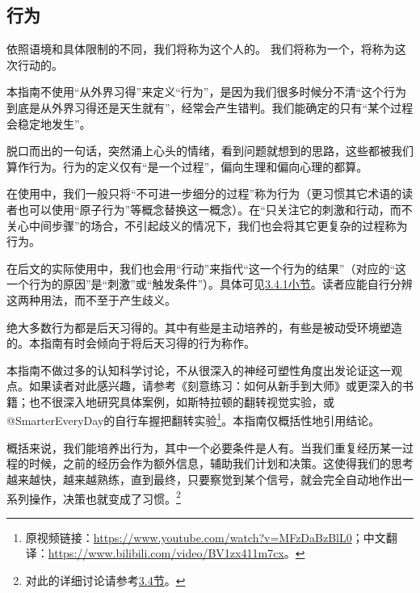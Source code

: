 \subsection{行为}
依照语境和具体限制的不同，我们将称为这个人的。%
我们将称为一个，将称为这次行动的。
\begin{explain}

本指南不使用“从外界习得”来定义“行为”，是因为我们很多时候分不清“这个行为到底是从外界习得还是天生就有”，经常会产生错判。我们能确定的只有“某个过程会稳定地发生”。

脱口而出的一句话，突然涌上心头的情绪，看到问题就想到的思路，这些都被我们算作行为。行为的定义仅有“是一个过程”，偏向生理和偏向心理的都算。

在使用中，我们一般只将“不可进一步细分的过程”称为行为（更习惯其它术语的读者也可以使用“原子行为”等概念替换这一概念）。在“只关注它的刺激和行动，而不关心中间步骤”的场合，不引起歧义的情况下，我们也会将其它更复杂的过程称为行为。

在后文的实际使用中，我们也会用“行动”来指代“这一个行为的结果”（对应的“这一个行为的原因”是“刺激”或“触发条件”）。具体可见\hyperref[para:行动]{3.4.1小节}。读者应能自行分辨这两种用法，而不至于产生歧义。
\end{explain}
绝大多数行为都是后天习得的。其中有些是主动培养的，有些是被动受环境塑造的。本指南有时会倾向于将后天习得的行为称作。
\begin{examples}
本指南不做过多的认知科学讨论，不从很深入的神经可塑性角度出发论证这一观点。如果读者对此感兴趣，请参考《刻意练习：如何从新手到大师》或更深入的书籍；也不很深入地研究具体案例，如斯特拉顿的翻转视觉实验，或@SmarterEveryDay的自行车握把翻转实验\footnote{原视频链接：\url{https://www.youtube.com/watch?v=MFzDaBzBlL0}；中文翻译：\url{https://www.bilibili.com/video/BV1zx411m7cx}。}。本指南仅概括性地引用结论。
\end{examples}
\label{para:记忆}概括来说，我们能培养出行为，其中一个必要条件是人有。当我们重复经历某一过程的时候，之前的经历会作为额外信息，辅助我们计划和决策。这使得我们的思考越来越快，越来越熟练，直到最终，只要察觉到某个信号，就会完全自动地作出一系列操作，决策也就变成了习惯。\footnote{对此的详细讨论请参考\hyperref[sec:人的意识演化基本模型]{3.4节}。}
